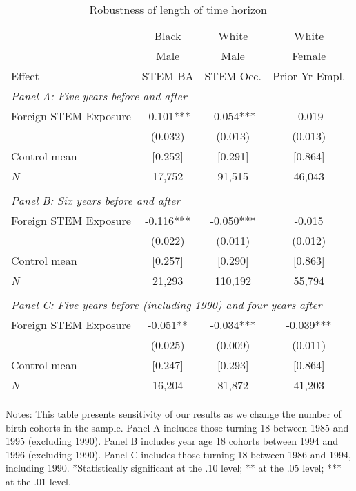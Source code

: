 \begin{table}[ht]
\caption{Robustness of length of time horizon}
\label{tab:ta1}
\centering
\begin{threeparttable}
\begin{tabular}{lccc}
\toprule 
       & Black           & White        & White       \\
       & Male            & Male         & Female      \\
Effect & STEM BA         & STEM Occ.    & Prior Yr Empl.\\
\midrule 
\multicolumn{4}{l}{\emph{Panel A: Five years before and after}}\\ 
Foreign STEM Exposure & -0.101*** & -0.054*** & -0.019  \\ 
 &  (0.032)        & (0.013)        & (0.013) \\ 
Control mean &  [0.252]        & [0.291] & [0.864] \\ 
\emph{N} &     17,752          &    91,515          &    46,043 \\ 
                         &                              &                              &\\
\multicolumn{4}{l}{\emph{Panel B: Six years before and after}}\\ 
Foreign STEM Exposure & -0.116*** & -0.050*** & -0.015  \\ 
 &  (0.022)        & (0.011)        & (0.012) \\ 
Control mean &  [0.257]        & [0.290] & [0.863] \\ 
\emph{N} &     21,293          &   110,192          &    55,794 \\ 
                         &                              &                              &\\
\multicolumn{4}{l}{\emph{Panel C: Five years before (including 1990) and four years after}}\\ 
Foreign STEM Exposure & -0.051** & -0.034*** & -0.039*** \\ 
 &  (0.025)        & (0.009)        & (0.011) \\ 
Control mean &  [0.247]        & [0.293] & [0.864] \\ 
\emph{N} &     16,204          &    81,872          &    41,203 \\ 
\bottomrule 
\end{tabular} 
\footnotesize Notes: This table presents sensitivity of our results as we change the number of birth cohorts in the sample. Panel A includes those turning 18 between 1985 and 1995 (excluding 1990). Panel B includes year age 18 cohorts between 1994 and 1996 (excluding 1990). Panel C includes those turning 18 between 1986 and 1994, including 1990. *Statistically significant at the .10 level; ** at the .05 level; *** at the .01 level.
\end{threeparttable} 
\end{table} 
